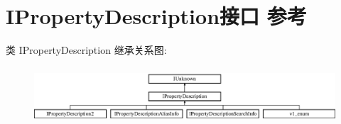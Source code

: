 \hypertarget{interface_i_property_description}{}\section{I\+Property\+Description接口 参考}
\label{interface_i_property_description}
类 I\+Property\+Description 继承关系图\+:\begin{figure}[H]
\begin{center}
\leavevmode
\includegraphics[height=2.121212cm]{interface_i_property_description}
\end{center}
\end{figure}
